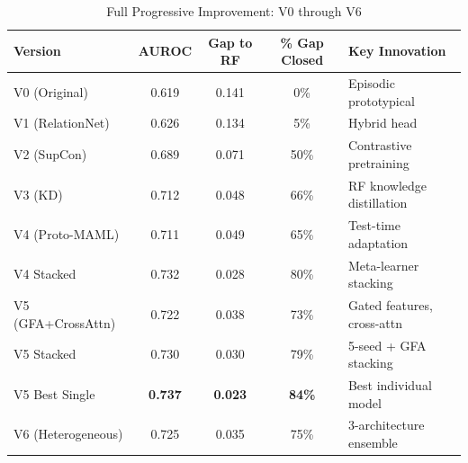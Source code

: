 \begin{table}[htbp]
\centering
\caption{Full Progressive Improvement: V0 through V6}
\small
\begin{tabular}{lcccp{4.5cm}}
\toprule
Version & AUROC & Gap to RF & \% Gap Closed & Key Innovation \\
\midrule
V0 (Original) & 0.619 & 0.141 & 0\% & Episodic prototypical \\
V1 (RelationNet) & 0.626 & 0.134 & 5\% & Hybrid head \\
V2 (SupCon) & 0.689 & 0.071 & 50\% & Contrastive pretraining \\
V3 (KD) & 0.712 & 0.048 & 66\% & RF knowledge distillation \\
V4 (Proto-MAML) & 0.711 & 0.049 & 65\% & Test-time adaptation \\
V4 Stacked & 0.732 & 0.028 & 80\% & Meta-learner stacking \\
V5 (GFA+CrossAttn) & 0.722 & 0.038 & 73\% & Gated features, cross-attn \\
V5 Stacked & 0.730 & 0.030 & 79\% & 5-seed + GFA stacking \\
V5 Best Single & \textbf{0.737} & \textbf{0.023} & \textbf{84\%} & Best individual model \\
V6 (Heterogeneous) & 0.725 & 0.035 & 75\% & 3-architecture ensemble \\
\bottomrule
\end{tabular}
\label{tab:progressive_full}
\end{table}
